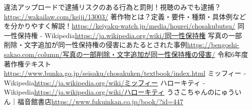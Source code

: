 \documentclass[titlepage,a4paper]{jsarticle}
\begin{document}
\newpage
\begin{thebibliography}{99}
  違法アップロードで逮捕リスクのある行為と罰則！視聴のみでも逮捕？\url{https://wakailaw.com/keiji/13003/}
  著作物とは？定義・要件・種類・具体例などを分かりやすく解説！\url{https://keiyaku-watch.jp/media/hourei/chosakubutsu/}
  同一性保持権 - Wikipedia\url{https://ja.wikipedia.org/wiki/同一性保持権}
  写真の一部削除・文字追加が同一性保持権の侵害にあたるとされた事例\url{https://bengoshi-sakao.com/column/写真の一部削除・文字追加が同一性保持権の侵害/}
  令和6年度著作権テキスト\url{https://www.bunka.go.jp/seisaku/chosakuken/textbook/index.html}
  ミッフィー - Wikipedia\url{https://ja.wikipedia.org/wiki/ミッフィー}
  ハローキティ - Wikipedia\url{https://ja.wikipedia.org/wiki/ハローキティ}
  うさこちゃんのにゅういん｜福音館書店\url{https://www.fukuinkan.co.jp/book/?id=447}
\end{thebibliography}
\end{document}
